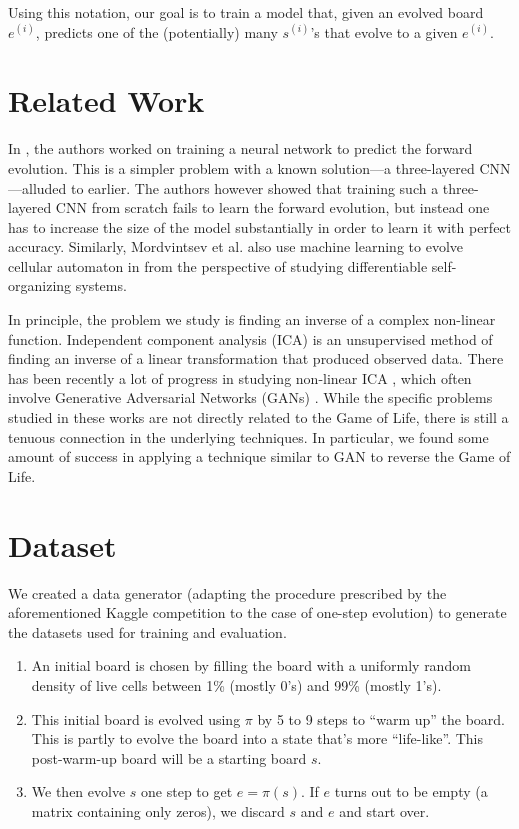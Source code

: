 \documentclass[conference]{IEEEtran}
\begin{document}
Using this notation, our goal is to train a model that, given an evolved board $e^{(i)}$, predicts one of the (potentially) many $s^{(i)}$'s that evolve to a given $e^{(i)}$.

\section{Related Work}
In \cite{springer2020its}, the authors worked on training a neural network to predict the forward evolution. This is a simpler problem with a known solution---a three-layered CNN---alluded to earlier. The authors however showed that training such a three-layered CNN from scratch fails to learn the forward evolution, but instead one has to increase the size of the model substantially in order to learn it with perfect accuracy. Similarly, Mordvintsev et al. also use machine learning to evolve cellular automaton in \cite{mordvintsev2020growing} from the perspective of studying differentiable self-organizing systems.

In principle, the problem we study is finding an inverse of a complex non-linear function. Independent component analysis (ICA)  is an unsupervised method of finding an inverse of a linear transformation that produced observed data. There has been recently a lot of progress in studying non-linear ICA \cite{hyvarinen2019nonlinear} \cite{brakel2017learning}, which often involve Generative Adversarial Networks (GANs) \cite{goodfellow2014generative}. While the specific problems studied in these works are not directly related to the Game of Life, there is still a tenuous connection in the underlying techniques. In particular, we found some amount of success in applying a technique similar to GAN to reverse the Game of Life.

\section{Dataset}
\label{dataset}
We created a data generator (adapting the procedure prescribed by the aforementioned Kaggle competition to the case of one-step evolution) to generate the datasets used for training and evaluation.

\begin{enumerate}
\item An initial board is chosen by filling the board with a uniformly random density of live cells between 1\% (mostly 0's) and 99\% (mostly 1's).
\item This initial board is evolved using $\pi$ by 5 to 9 steps to ``warm up'' the board. This is partly to evolve the board into a state that's more ``life-like''. This post-warm-up board will be a starting board $s$.
\item We then evolve $s$ one step to get $e = \pi(s)$. If $e$ turns out to be empty (a matrix containing only zeros), we discard $s$ and $e$ and start over.
\end{enumerate}
\end{document}
